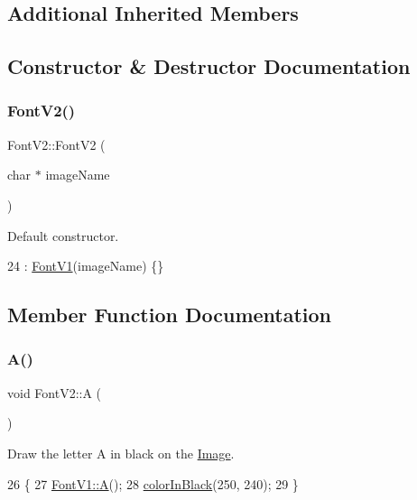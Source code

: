 \subsection*{Additional Inherited Members}


\subsection{Constructor \& Destructor Documentation}
\mbox{\label{class_font_v2_aecf9c03af709aa99c23f5c785e798ef4}} 
\subsubsection{\texorpdfstring{Font\+V2()}{FontV2()}}
{\footnotesize\ttfamily Font\+V2\+::\+Font\+V2 (\begin{DoxyParamCaption}\item[{char $\ast$}]{image\+Name }\end{DoxyParamCaption})\hspace{0.3cm}{\ttfamily [inline]}}



Default constructor. 


\begin{DoxyCode}
24 : \mbox{\hyperlink{class_font_v1_ada1ed699d42679f81146af4bc20db006}{FontV1}}(imageName) \{\}
\end{DoxyCode}


\subsection{Member Function Documentation}
\mbox{\label{class_font_v2_ae1a96e014f4cc9e4447b0a2d947f4a33}} 
\subsubsection{\texorpdfstring{A()}{A()}}
{\footnotesize\ttfamily void Font\+V2\+::A (\begin{DoxyParamCaption}{ }\end{DoxyParamCaption})}



Draw the letter A in black on the \mbox{\hyperlink{class_image}{Image}}. 


\begin{DoxyCode}
26                \{
27     \mbox{\hyperlink{class_font_v1_a29afd2079bc41cdec9d3de6bb4e1be52}{FontV1::A}}();
28     \mbox{\hyperlink{class_font_v2_a04f2501961bc286ce70fbb6a840b0e8a}{colorInBlack}}(250, 240);
29 \}
\end{DoxyCode}
\mbox{\label{class_font_v2_a0a895c96067874028864303ab64ce889}} 
